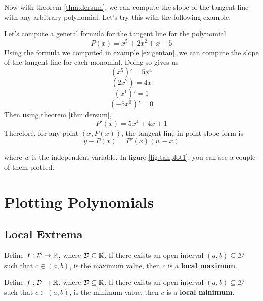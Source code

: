 Now with theorem \eqref{thm:dersum}, we can compute the slope of the tangent line with any arbitrary polynomial. Let's try this with the following example.

\begin{ex}
	Let's compute a general formula for the tangent line for the polynomial
	$$P(x)=x^5+2x^2+x-5$$
	Using the formula we computed in example \eqref{ex:gentan}, we can compute the slope of the tangent line for each monomial. Doing so gives us
	$$(x^5)'=5x^4$$
	$$(2x^2)=4x$$
	$$(x^1)'=1$$
	$$(-5x^0)'=0$$
	Then using theorem \eqref{thm:dersum},
	$$P'(x)=5x^4+4x+1$$
	Therefore, for any point $(x,P(x))$, the tangent line in point-slope form is
	$$y-P(x)=P'(x)(w-x)$$
	\begin{figure}[h]
		\centering
		\caption{}
		\label{fig:tanplot1}
	\end{figure}
	where $w$ is the independent variable. In figure \eqref{fig:tanplot1}, you can see a couple of them plotted.
\end{ex}

\section{Plotting Polynomials}
\subsection{Local Extrema}
\begin{define}
	Define $f:\mathcal{D}\to\mathbb{R}$, where $\mathcal{D}\subseteq\mathbb{R}$. If there exists an open interval $(a,b)\subseteq\mathcal{D}$ such that $c\in(a,b)$, is the maximum value, then $c$ is a \textbf{local maximum}.
\end{define}
\begin{define}
	Define $f:\mathcal{D}\to\mathbb{R}$, where $\mathcal{D}\subseteq\mathbb{R}$. If there exists an open interval $(a,b)\subseteq\mathcal{D}$ such that $c\in(a,b)$, is the minimum value, then $c$ is a \textbf{local minimum}.
\end{define}

